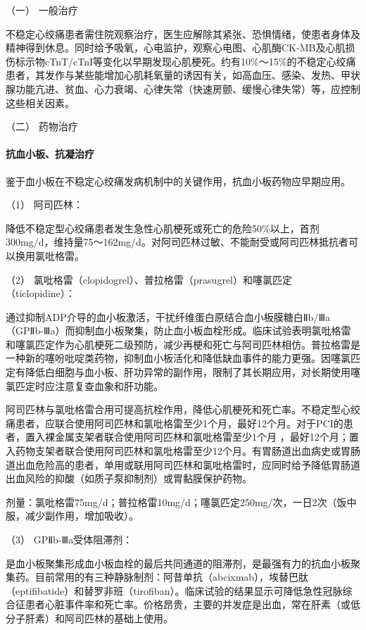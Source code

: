 \hypertarget{text00309.htmlux5cux23CHP10-7-3-2-1}{}
（一） 一般治疗

不稳定心绞痛患者需住院观察治疗，医生应解除其紧张、恐惧情绪，使患者身体及精神得到休息。同时给予吸氧，心电监护，观察心电图、心肌酶CK-MB及心肌损伤标示物cTnT/cTnI等变化以早期发现心肌梗死。约有10\%～15\%的不稳定心绞痛患者，其发作与某些能增加心肌耗氧量的诱因有关，如高血压、感染、发热、甲状腺功能亢进、贫血、心力衰竭、心律失常（快速房颤、缓慢心律失常）等，应控制这些相关因素。

\hypertarget{text00309.htmlux5cux23CHP10-7-3-2-2}{}
（二） 药物治疗

\paragraph{抗血小板、抗凝治疗}

鉴于血小板在不稳定心绞痛发病机制中的关键作用，抗血小板药物应早期应用。

\hypertarget{text00309.htmlux5cux23CHP10-7-3-2-2-1-1}{}
（1） 阿司匹林：

降低不稳定型心绞痛患者发生急性心肌梗死或死亡的危险50\%以上，首剂300mg/d，维持量75～162mg/d。对阿司匹林过敏、不能耐受或阿司匹林抵抗者可以换用氯吡格雷。

\hypertarget{text00309.htmlux5cux23CHP10-7-3-2-2-1-2}{}
（2）
氯吡格雷（clopidogrel）、普拉格雷（prasugrel）和噻氯匹定（ticlopidine）：

通过抑制ADP介导的血小板激活，干扰纤维蛋白原结合血小板膜糖白Ⅱb/Ⅲa（GPⅡb-Ⅲa）而抑制血小板聚集，防止血小板血栓形成。临床试验表明氯吡格雷和噻氯匹定作为心肌梗死二级预防，减少再梗和死亡与阿司匹林相仿。普拉格雷是一种新的噻吩吡啶类药物，抑制血小板活化和降低缺血事件的能力更强。因噻氯匹定有降低白细胞与血小板、肝功异常的副作用，限制了其长期应用，对长期使用噻氯匹定时应注意复查血象和肝功能。

阿司匹林与氯吡格雷合用可提高抗栓作用，降低心肌梗死和死亡率。不稳定型心绞痛患者，应联合使用阿司匹林和氯吡格雷至少1个月，最好12个月。对于PCI的患者，置入裸金属支架者联合使用阿司匹林和氯吡格雷至少1个月
，最好12个月；置入药物支架者联合使用阿司匹林和氯吡格雷至少12个月。有胃肠道出血病史或胃肠道出血危险高的患者，单用或联用阿司匹林和氯吡格雷时，应同时给予降低胃肠道出血风险的抑酸（如质子泵抑制剂）或胃黏膜保护药物。

剂量：氯吡格雷75mg/d；普拉格雷10mg/d；噻氯匹定250mg/次，一日2次（饭中服，减少副作用，增加吸收）。

\hypertarget{text00309.htmlux5cux23CHP10-7-3-2-2-1-3}{}
（3） GPⅡb-Ⅲa受体阻滞剂：

是血小板聚集形成血小板血栓的最后共同通道的阻滞剂，是最强有力的抗血小板聚集药。目前常用的有三种静脉制剂：阿昔单抗（abcixmab），埃替巴肽（eptifibatide）和替罗非班（tirofiban）。临床试验的结果显示可降低急性冠脉综合征患者心脏事件率和死亡率。价格昂贵，主要的并发症是出血，常在肝素（或低分子肝素）和阿司匹林的基础上使用。

